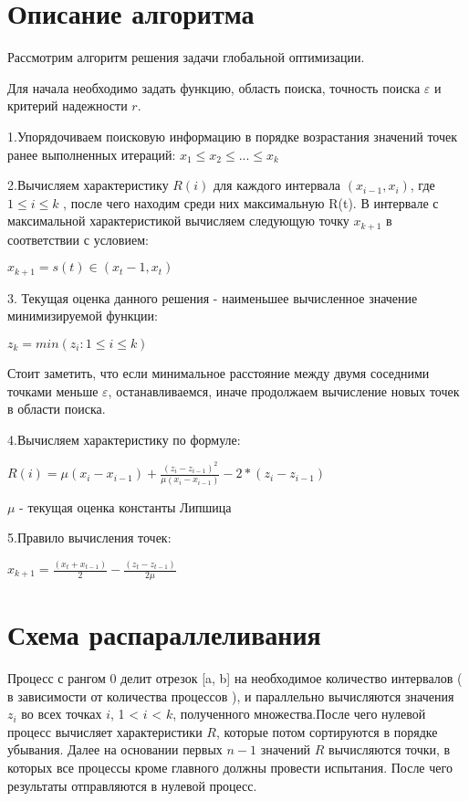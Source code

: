 \documentclass{report}
\begin{document}
\section*{Описание алгоритма}
\par Рассмотрим алгоритм решения задачи глобальной оптимизации.
\par Для начала необходимо задать функцию, область поиска, точность
поиска $\varepsilon$ и критерий надежности $r$.
\par 1.Упорядочиваем поисковую информацию в порядке возрастания значений точек
ранее выполненных итераций: $x_1 \leq x_2 \leq ...  \leq x_k $
\par 2.Вычисляем характеристику $R(i)$ для каждого интервала $(x_{i-1},x_i)$, где $1 \leq i \leq k $ , после чего находим 
среди них максимальную R(t). В интервале с максимальной характеристикой вычисляем следующую точку $x_{k+1}$ в соответствии с условием:
\par $x_{k+1} = s(t) \in (x_t-1,x_t)$
\par 3. Текущая оценка данного решения - наименьшее вычисленное значение минимизируемой функции:
\par $z_k = min (z_i : 1 \leq i \leq k)$
\par Стоит заметить, что если минимальное расстояние между двумя соседними точками меньше $\varepsilon$,
останавливаемся, иначе продолжаем вычисление новых точек в области поиска.
\par 4.Вычисляем характеристику по формуле:
\par $R(i) = \mu( x_i - x_{i-1} ) + \frac{(z_i - z_{i-1})^2}{\mu(x_i - x_{i-1})} - 2*(z_i - z_{i-1})$
\par $\mu$ - текущая оценка константы Липшица
\par 5.Правило вычисления точек:
\par $x_{k+1} =  \frac{(x_t + x_{t-1})}{2} - \frac{(z_t - z_{t-1})}{2\mu} $
\newpage

\section*{Схема распараллеливания}
\par Процесс с рангом 0 делит отрезок [a, b] на необходимое количество интервалов ( в зависимости от количества процессов ), и параллельно вычисляются значения $z_i$ во всех точках $i$, 1 < $i$ < $k$, полученного множества.После чего нулевой процесс вычисляет характеристики $R$, которые потом сортируются в порядке убывания. Далее на основании первых $n-1$ значений $R$ вычисляются точки, в которых все процессы кроме главного должны провести испытания. После чего результаты отправляются в нулевой процесс.
\end{document}
